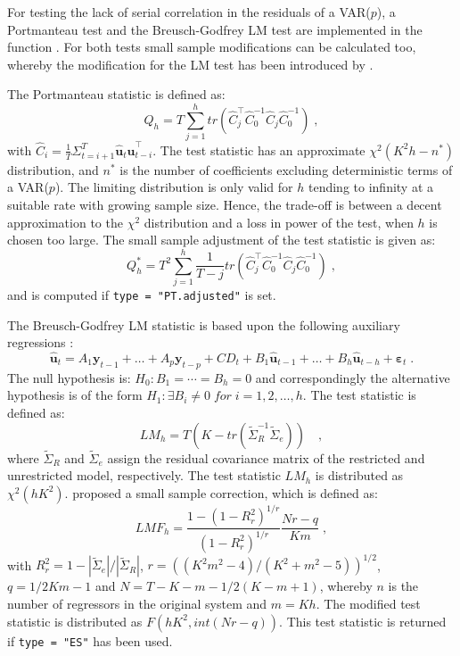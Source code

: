 \documentclass[nojss]{jss}
\begin{document}
For testing the lack of serial correlation in the residuals of a
VAR($p$), a Portmanteau test and the Breusch-Godfrey LM test are
implemented in the function . For both tests small
sample modifications can be calculated too, whereby the modification
for the LM test has been introduced by \cite{EDG1999}.

The Portmanteau statistic is defined as:
\begin{equation}
Q_h = T \sum_{j=1}^h tr(\hat{C}_j^\top\hat{C}_0^{-1}\hat{C}_j\hat{C}_0^{-1}) \; ,
\end{equation}
%
with $\hat{C}_i = \frac{1}{T}\Sigma_{t=i+1}^T \hat{\mathbf{u}}_t
\hat{\mathbf{u}}_{t-i}^\top$. The test statistic has an approximate
$\chi^2(K^2h-n^*)$ distribution, and $n^*$ is the number of
coefficients excluding deterministic terms of a VAR($p$). The limiting
distribution is only valid for $h$ tending to infinity at a suitable
rate with growing sample size. Hence, the trade-off is between a
decent approximation to the $\chi^2$ distribution and a loss in power
of the test, when $h$ is chosen too large. The small sample adjustment
of the test statistic is given as: 
\begin{equation}
Q_h^* = T^2 \sum_{j=1}^h \frac{1}{T-j}
tr(\hat{C}_j^\top\hat{C}_0^{-1}\hat{C}_j\hat{C}_0^{-1}) \; ,
\end{equation}
and is computed if \verb/type = "PT.adjusted"/ is set.

The Breusch-Godfrey LM statistic is based upon the following auxiliary
regressions \citep[see][]{BRE1978, GOD1978}:
\begin{equation}
\hat{\mathbf{u}}_t = A_1 \mathbf{y}_{t-1} + \ldots +
A_p\mathbf{y}_{t-p} + CD_t + B_1\hat{\mathbf{u}}_{t-1} + \ldots +
B_h\hat{\mathbf{u}}_{t-h} + \mathbf{\varepsilon}_t \;. 
\end{equation}
The null hypothesis is: $H_0: B_1 = \cdots = B_h = 0$ and
correspondingly the alternative hypothesis is of the form $H_1:
\exists B_i \ne 0 \; for \; i = 1, 2, \ldots, h$. The test statistic
is defined as: 
\begin{equation}
\mathit{LM}_h = T(K - tr(\tilde{\Sigma}_R^{-1}\tilde{\Sigma}_e))  \quad ,
\end{equation}
where $\tilde{\Sigma}_R$ and $\tilde{\Sigma}_e$ assign the residual
covariance matrix of the restricted and unrestricted model,
respectively. The test statistic $\mathit{LM}_h$ is distributed as
$\chi^2(hK^2)$.
\citet{EDG1999} proposed a small sample correction, which is defined as:
\begin{equation}
\mathit{LMF}_h = \frac{1 - (1 - R_r^2)^{1/r}}{(1 - R_r^2)^{1/r}} \frac{Nr - q}{K m} \; ,
\end{equation}
with $R_r^2 = 1 - |\tilde{\Sigma}_e | / |\tilde{\Sigma}_R|$, $r =
((K^2m^2 - 4)/(K^2 + m^2 - 5))^{1/2}$, $q = 1/2 K m - 1$ and $N = T -
K - m - 1/2(K - m + 1)$, whereby $n$ is the number of regressors in
the original system and $m = Kh$. The modified test statistic is
distributed as $F(hK^2, int(Nr - q))$. This test statistic is returned
if \verb/type = "ES"/ has been used.
\end{document}
